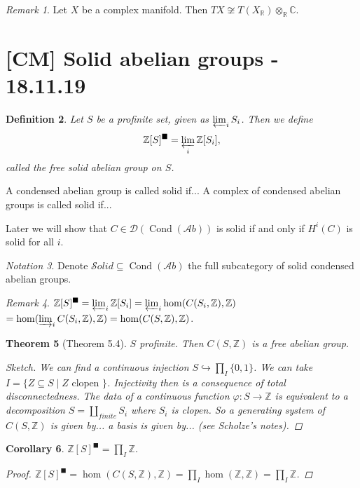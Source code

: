 \documentclass[12pt]{article}
\theoremstyle{darkgreentheorem}
\newtheorem{thm}{Theorem}[section]
\newtheorem{cor}[thm]{Corollary}
\theoremstyle{darkbluedefinition}
\newtheorem{defn}[thm]{Definition}
\theoremstyle{darkredexample}
\theoremstyle{remark}
\newtheorem{rem}[thm]{Remark}
\newtheorem{nota}[thm]{Notation}
\newcommand{\Z}{\mathbb{Z}}
\newcommand{\R}{\mathbb{R}}
\newcommand{\1}{\mathbbm{1}}
\newcommand{\C}{\mathbb{C}}
\newcommand{\Ab}{\mathscr{A}b}
\newcommand{\D}{\mathscr{D}}
\newcommand{\Solid}{\mathscr{S}olid}
\DeclareMathOperator{\Cond}{Cond}
\newcommand{\ot}{\otimes}
\newcommand{\sub}{\subseteq}
\newcommand{\mono}{\hookrightarrow}
\newcommand{\solid}{^{\blacksquare}}
\begin{document}
\begin{rem}
    Let $X$ be a complex manifold.
    Then $TX\not\cong T(X_{\R})\ot_{\R}\C$.
\end{rem}

\section{[CM] Solid abelian groups - 18.11.19}

\begin{defn}
    Let $S$ be a profinite set, given as $\varprojlim_{i} S_{i}$.
    Then we define
    \[ \Z[S]\solid=\varprojlim_{i}\Z[S_{i}],\]
    called the free solid abelian group on $S$.
\end{defn}

A condensed abelian group is called solid if...
A complex of condensed abelian groups is called solid if...

Later we will show that $C\in \D(\Cond(\Ab))$ is solid if and only if $H^{i}(C)$ is solid for all $i$.

\begin{nota}
    Denote $\Solid\sub \Cond(\Ab)$ the full subcategory of solid condensed abelian groups.
\end{nota}

\begin{rem}
    $\Z[S]\solid=\varprojlim_{i}\Z[S_{i}]=\varprojlim_{i}\hom(C(S_{i},\Z),\Z)$$=\hom(\varinjlim_{i}C(S_{i},\Z),\Z)=\hom(C(S,\Z),\Z)$.
\end{rem}

\begin{thm}[Theorem 5.4]
    $S$ profinite.
    Then $C(S,\Z)$ is a free abelian group.
    \begin{proof}[Sketch]
	We can find a continuous injection $S\mono \prod_{I}\{0,1\}$.
	We can take $I=\{ Z \sub S\mid Z\text{ clopen }\}$.
	Injectivity then is a consequence of total disconnectedness.
	The data of a continuous function $\varphi\colon S\to \Z$ is equivalent to a decomposition $S=\coprod_{finite}S_{i}$ where $S_{i}$ is clopen.
	So a generating system of $C(S,\Z)$ is given by... a basis is given by... (see Scholze's notes).
    \end{proof}
\end{thm}

\begin{cor}
    $\Z[S]\solid=\prod_{I}\Z$.
    \begin{proof}
	$\Z[S]\solid=\hom(C(S,\Z),\Z)=\prod_{I}\hom(\Z,\Z)=\prod_{I}\Z$.
    \end{proof}
\end{cor}
\end{document}
